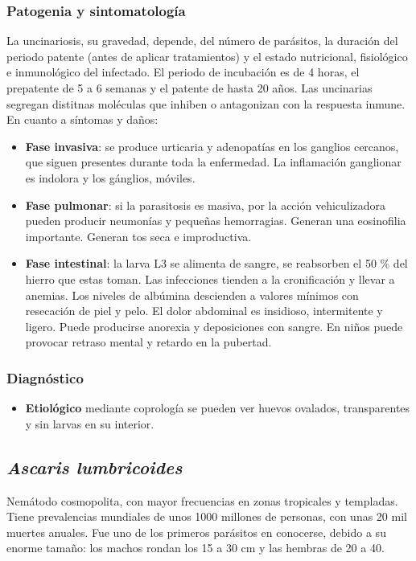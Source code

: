 \subsubsection{Patogenia y sintomatología}
La uncinariosis, su gravedad, depende, del número de parásitos, la duración del periodo patente (antes de aplicar tratamientos) y el estado nutricional, fisiológico e inmunológico del infectado. El periodo de incubación es de 4 horas, el prepatente de 5 a 6 semanas y el patente de hasta 20 años. Las uncinarias segregan distitnas moléculas que inhiben o antagonizan con la respuesta inmune. En cuanto a síntomas y daños:
\begin{itemize}[itemsep=0pt,parsep=0pt,topsep=0pt,partopsep=0pt]
	\item\textbf{Fase invasiva}: se produce urticaria y adenopatías en los ganglios cercanos, que siguen presentes durante toda la enfermedad. La inflamación ganglionar es indolora y los gánglios, móviles.
	\item\textbf{Fase pulmonar}: si la parasitosis es masiva, por la acción vehiculizadora pueden producir neumonías y pequeñas hemorragias. Generan una eosinofilia importante. Generan tos seca e improductiva.
	\item\textbf{Fase intestinal}: la larva L3 se alimenta de sangre, se reabsorben el 50 \% del hierro que estas toman. Las infecciones tienden a la cronificación y llevar a anemias. Los niveles de albúmina descienden a valores mínimos con resecación de piel y pelo. El dolor abdominal es insidioso, intermitente y ligero. Puede producirse anorexia y deposiciones con sangre. En niños puede provocar retraso mental y retardo en la pubertad.
\end{itemize}
\subsubsection{Diagnóstico}
\begin{itemize}[itemsep=0pt,parsep=0pt,topsep=0pt,partopsep=0pt]
	\item\textbf{Etiológico} mediante coprología se pueden ver huevos ovalados, transparentes y sin larvas en su interior.
\end{itemize}
\newpage
\subsection{\textit{Ascaris lumbricoides}}
Nemátodo cosmopolita, con mayor frecuencias en zonas tropicales y templadas. Tiene prevalencias mundiales de unos 1000 millones de personas, con unas 20 mil muertes anuales. Fue uno de los primeros parásitos en conocerse, debido a su enorme tamaño: los machos rondan los 15 a 30 cm y las hembras de 20 a 40.
